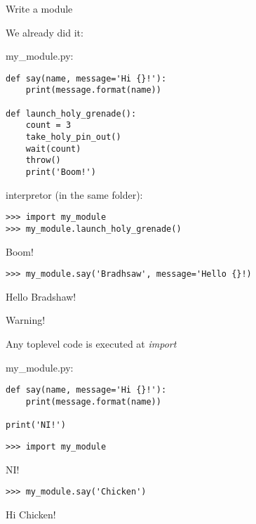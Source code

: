 \documentclass[ignorenonframetext,]{beamer}
\begin{document}
\begin{frame}[fragile]{Write a module}

    We already did it:

    \begin{overprint}
    my\_module.py:
    \begin{tcolorbox}
        \begin{verbatim}
def say(name, message='Hi {}!'):
    print(message.format(name))

def launch_holy_grenade():
    count = 3
    take_holy_pin_out()
    wait(count)
    throw()
    print('Boom!')
        \end{verbatim}
    \end{tcolorbox}

    interpretor (in the same folder):
    \begin{tcolorbox}
        \begin{verbatim}
>>> import my_module
>>> my_module.launch_holy_grenade()
        \end{verbatim}
Boom!
        \begin{verbatim}
>>> my_module.say('Bradhsaw', message='Hello {}!)
        \end{verbatim}
Hello Bradshaw!
    \end{tcolorbox}
    \end{overprint}
\end{frame}

\begin{frame}[fragile]{Warning!}

    Any toplevel code is executed at \emph{import}

    my\_module.py:
    \begin{tcolorbox}
        \begin{verbatim}
def say(name, message='Hi {}!'):
    print(message.format(name))

print('NI!')
        \end{verbatim}
    \end{tcolorbox}

    \begin{tcolorbox}
        \begin{verbatim}
>>> import my_module
        \end{verbatim}
NI!
        \begin{verbatim}
>>> my_module.say('Chicken')
        \end{verbatim}
Hi Chicken!
    \end{tcolorbox}
\end{frame}
\end{document}
